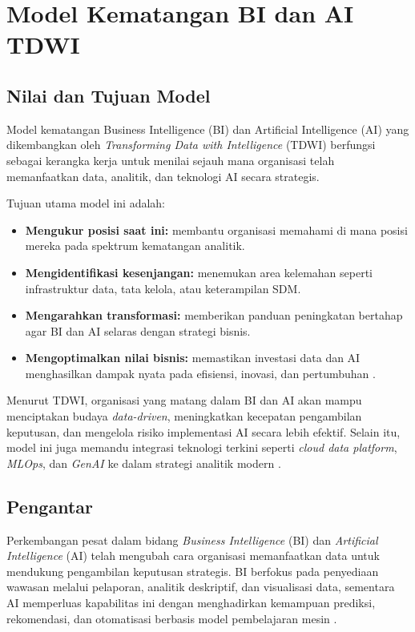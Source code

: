 \chapter{Model Kematangan BI dan AI TDWI}
\label{chap:tdwi_bi_ai_maturity}

\section{Nilai dan Tujuan Model}

Model kematangan Business Intelligence (BI) dan Artificial Intelligence (AI) yang dikembangkan oleh 
\textit{Transforming Data with Intelligence} (TDWI) berfungsi sebagai kerangka kerja untuk menilai sejauh mana organisasi 
telah memanfaatkan data, analitik, dan teknologi AI secara strategis.  

Tujuan utama model ini adalah:
\begin{itemize}
	\item \textbf{Mengukur posisi saat ini:} membantu organisasi memahami di mana posisi mereka pada spektrum kematangan analitik.
	\item \textbf{Mengidentifikasi kesenjangan:} menemukan area kelemahan seperti infrastruktur data, tata kelola, atau keterampilan SDM.
	\item \textbf{Mengarahkan transformasi:} memberikan panduan peningkatan bertahap agar BI dan AI selaras dengan strategi bisnis.
	\item \textbf{Mengoptimalkan nilai bisnis:} memastikan investasi data dan AI menghasilkan dampak nyata pada efisiensi, inovasi, dan pertumbuhan \cite{tdwi2025, eckerson2009tdwi}.
\end{itemize}

Menurut TDWI, organisasi yang matang dalam BI dan AI akan mampu menciptakan budaya \textit{data-driven}, 
meningkatkan kecepatan pengambilan keputusan, dan mengelola risiko implementasi AI secara lebih efektif. 
Selain itu, model ini juga memandu integrasi teknologi terkini seperti \textit{cloud data platform}, \textit{MLOps}, dan \textit{GenAI} 
ke dalam strategi analitik modern \cite{fernandez2023ai_maturity}.

\section{Pengantar}

Perkembangan pesat dalam bidang \textit{Business Intelligence} (BI) dan \textit{Artificial Intelligence} (AI) telah 
mengubah cara organisasi memanfaatkan data untuk mendukung pengambilan keputusan strategis. BI berfokus pada 
penyediaan wawasan melalui pelaporan, analitik deskriptif, dan visualisasi data, sementara AI memperluas kapabilitas 
ini dengan menghadirkan kemampuan prediksi, rekomendasi, dan otomatisasi berbasis model pembelajaran mesin 
\cite{chen2012, davenport2018}. 

